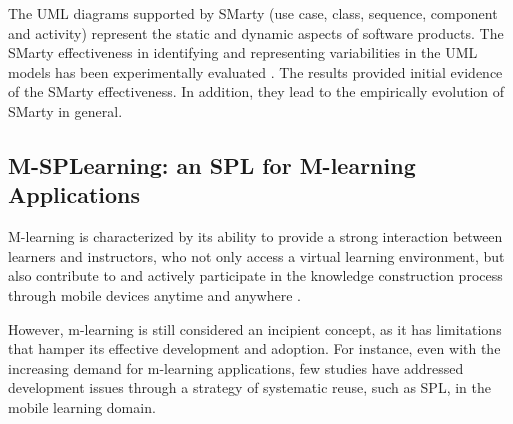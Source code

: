 
The UML diagrams supported by SMarty (use case, class, sequence, component and activity) represent the static and dynamic aspects of software products. The SMarty effectiveness in identifying and representing variabilities in the UML models has been experimentally evaluated \cite{marcolino13,marcolino14a,marcolino14b,bera15}. The results provided initial evidence of the SMarty effectiveness. In addition, they lead to the empirically evolution of SMarty in general.

\subsection{M-SPLear\allowbreak ning: an SPL for M-learning Applications}


M-learning is characterized by its ability to provide a strong interaction between learners and instructors, who not only access a virtual learning environment, but also contribute to and actively participate in the knowledge construction process through mobile devices anytime and anywhere \cite{kukulska05}. 


However, m-learning is still considered an incipient concept, as it has limitations that hamper its effective development and adoption. For instance, even with the increasing demand for m-learning applications, few studies have addressed development issues through a strategy of systematic reuse, such as SPL, in the mobile learning domain.  

